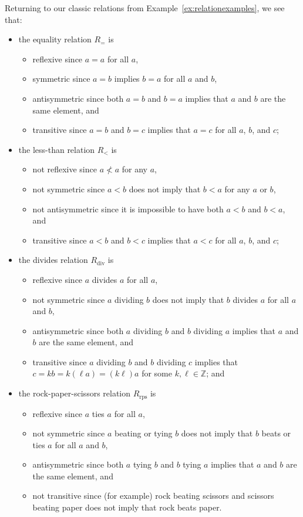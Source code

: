 \begin{example}
Returning to our classic relations from Example~\ref{ex:relationexamples}, we see that:
\begin{itemize}
\item the equality relation $R_{=}$ is 
	\begin{itemize}
	\item reflexive since $a = a$ for all $a$, 
	\item symmetric since $a = b$ implies $b = a$ for all $a$ and $b$, 
	\item antisymmetric since both $a = b$ and $b = a$ implies that $a$ and $b$ are the same element, and 
	\item transitive since $a = b$ and $b = c$ implies that $a = c$ for all $a$, $b$, and $c$;
	\end{itemize}
\item the less-than relation $R_{<}$ is 
	\begin{itemize}
	\item not reflexive since $a \not< a$ for any $a$, 
	\item not symmetric since $a < b$ does not imply that $b < a$ for any $a$ or $b$, 
	\item not antisymmetric since it is impossible to have both $a < b$ and $b < a$, and 
	\item transitive since $a < b$ and $b < c$ implies that $a < c$ for all $a$, $b$, and $c$;
	\end{itemize}
\item the divides relation $R_{\text{div}}$ is 
	\begin{itemize}
	\item reflexive since $a$ divides $a$ for all $a$, 
	\item not symmetric since $a$ dividing $b$ does not imply that $b$ divides $a$ for all $a$ and $b$, 
	\item antisymmetric since both $a$ dividing $b$ and $b$ dividing $a$ implies that $a$ and $b$ are the same element, and 
	\item transitive since $a$ dividing $b$ and $b$ dividing $c$ implies that $c = kb = k(\ell a) = (k\ell)a$ for some $k, \ell \in \mathbb{Z}$; and
	\end{itemize}
\item the rock-paper-scissors relation $R_{\text{rps}}$ is
	\begin{itemize}
	\item reflexive since $a$ ties $a$ for all $a$,
	\item not symmetric since $a$ beating or tying $b$ does not imply that $b$ beats or ties $a$ for all $a$ and $b$,
	\item antisymmetric since both $a$ tying $b$ and $b$ tying $a$ implies that $a$ and $b$ are the same element, and
	\item not transitive since (for example) rock beating scissors and scissors beating paper does not imply that rock beats paper.
	\end{itemize}
\end{itemize}
\end{example}


